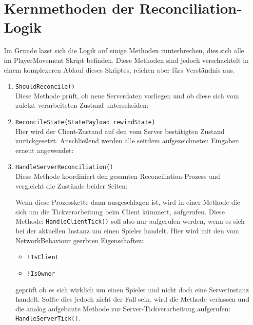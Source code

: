 \section{Kernmethoden der Reconciliation-Logik}
Im Grunde lässt sich die Logik auf einige Methoden runterbrechen, dies sich alle im PlayerMovement Skript befinden. Diese Methoden sind jedoch verschachtelt in einem komplexeren Ablauf dieses Skriptes, reichen aber fürs Verständnis aus. 
\newpage
\begin{enumerate}
    \item \texttt{ShouldReconcile()} \\
    Diese Methode prüft, ob neue Serverdaten vorliegen und ob diese sich vom zuletzt verarbeiteten Zustand unterscheiden:



    \item \texttt{ReconcileState(StatePayload rewindState)} \\
    Hier wird der Client-Zustand auf den vom Server bestätigten Zustand zurückgesetzt. Anschließend werden alle seitdem aufgezeichneten Eingaben erneut angewendet:



    \item \texttt{HandleServerReconciliation()} \\
    Diese Methode koordiniert den gesamten Reconciliation-Prozess und vergleicht die Zustände beider Seiten:



Wenn diese Prozesskette dann ausgeschlagen ist, wird in einer Methode die sich um die Tickverarbeitung beim Client kümmert, aufgerufen.
Diese Methode: \texttt{HandleClientTick()} soll also nur aufgerufen werden, wenn es sich bei der aktuellen Instanz um einen Spieler handelt. Hier wird mit den vom NetworkBehaviour geerbten Eigenschaften:
\begin{itemize}
  \item \texttt{!IsClient}
  \item \texttt{!IsOwner}
\end{itemize} 
geprüft ob es sich wirklich um einen Spieler und nicht doch eine Serverinstanz handelt. 
Sollte dies jedoch nicht der Fall sein, wird die Methode verlassen und die analog aufgebaute Methode zur Server-Tickverarbeitung aufgerufen: \texttt{HandleServerTick()}.


\end{enumerate}
